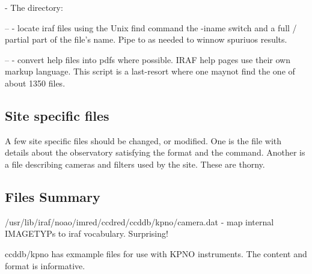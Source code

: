 - The  directory:

  --  - locate iraf files using the Unix find command the -iname
     switch and a full / partial part of the file's name. Pipe to 
     as needed to winnow spuriuos results.

  --  - convert help files into pdfs where possible. IRAF help pages
     use their own markup language. This script is a last-resort where one maynot
     find the one of about 1350  files.

\subsection{Site specific files}

A few site specific files should be changed, or modified. One is the
 file with details about the observatory satisfying the
 format and the  command.
Another is a file describing cameras and filters used by the site. These
are thorny.



\subsection{Files Summary}

/usr/lib/iraf/noao/imred/ccdred/ccddb/kpno/camera.dat - map internal IMAGETYPs
to iraf vocabulary. Surprising! 

ccddb/kpno has exmample files for use with KPNO instruments. The
content and format is informative.


